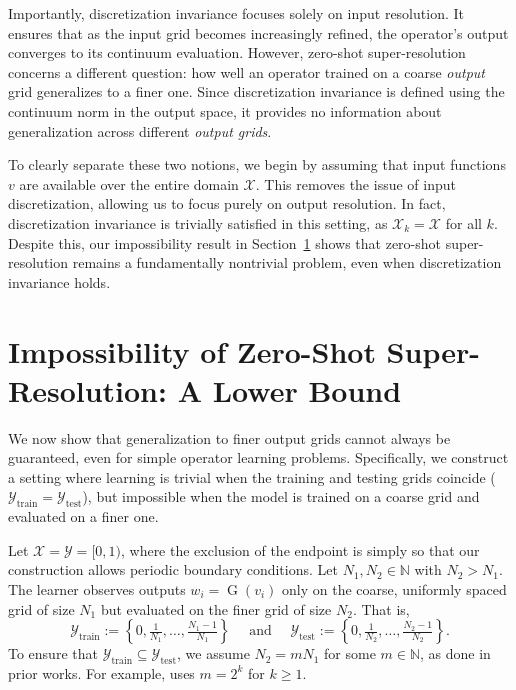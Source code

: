 \documentclass[11pt]{article}
\theoremstyle{plain}
\newcommand{\Xcal}{\mathcal{X}}
\newcommand{\Ycal}{\mathcal{Y}}
\begin{document}
Importantly, discretization invariance focuses solely on input resolution. It ensures that as the input grid becomes increasingly refined, the operator’s output converges to its continuum evaluation. However, zero-shot super-resolution concerns a different question: how well an operator trained on a coarse \emph{output} grid generalizes to a finer one. Since discretization invariance is defined using the continuum norm in the output space, it provides no information about generalization across different \emph{output grids}.

To clearly separate these two notions, we begin by assuming that input functions $ v $ are available over the entire domain $ \Xcal $. This removes the issue of input discretization, allowing us to focus purely on output resolution. In fact, discretization invariance is trivially satisfied in this setting, as $ \Xcal_k = \Xcal $ for all $ k $. Despite this, our impossibility result in Section~\ref{sec:impossibility} shows that zero-shot super-resolution remains a fundamentally nontrivial problem, even when discretization invariance holds. 






\section{Impossibility of Zero-Shot Super-Resolution: A Lower Bound}\label{sec:impossibility}

We now show that generalization to finer output grids cannot always be guaranteed, even for simple operator learning problems. Specifically, we construct a setting where learning is trivial when the training and testing grids coincide ($ \Ycal_{\mathrm{train}} = \Ycal_{\mathrm{test}} $), but impossible when the model is trained on a coarse grid and evaluated on a finer one.

Let $ \mathcal{X} = \mathcal{Y} = [0,1) $, where the exclusion of the endpoint is simply so that our construction allows periodic boundary conditions. Let $ N_1, N_2 \in \mathbb{N} $ with $ N_2 > N_1 $. The learner observes outputs $ w_i = \operatorname{G}(v_i) $ only on the coarse, uniformly spaced grid of size $N_1$ but evaluated on the finer grid of size $N_2$. That is,
\[
\mathcal{Y}_{\text{train}} := \left\{ 0, \tfrac{1}{N_1}, \ldots, \tfrac{N_1 - 1}{N_1} \right\} \quad \text{ and } \quad  \mathcal{Y}_{\text{test}} := \left\{ 0, \tfrac{1}{N_2}, \ldots, \tfrac{N_2 - 1}{N_2} \right\}.
\]
To ensure that $ \mathcal{Y}_{\text{train}} \subseteq \mathcal{Y}_{\text{test}} $, we assume $ N_2 = m N_1 $ for some $ m \in \mathbb{N} $, as done in prior works. For example,  \cite{li2020fourier} uses $ m = 2^k $ for $ k \geq 1 $.
\end{document}

